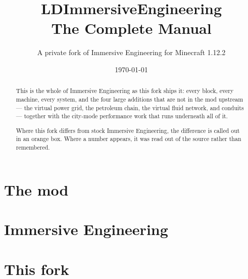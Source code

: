\documentclass[11pt,openany]{report}
\title{\Huge\sffamily\bfseries LDImmersiveEngineering\\[6pt]
       \Large\mdseries The Complete Manual}
\author{\sffamily A private fork of Immersive Engineering for Minecraft 1.12.2}
\date{\sffamily\today}
\begin{document}
\maketitle

\begin{abstract}
\noindent
This is the whole of Immersive Engineering as this fork ships it: every block, every machine,
every system, and the four large additions that are not in the mod upstream --- the virtual power
grid, the petroleum chain, the virtual fluid network, and conduits --- together with the city-mode
performance work that runs underneath all of it.

Where this fork differs from stock Immersive Engineering, the difference is called out in an
orange box. Where a number appears, it was read out of the source rather than remembered.
\end{abstract}

\tableofcontents

\part{The mod}



\part{Immersive Engineering}








\part{This fork}







\end{document}
